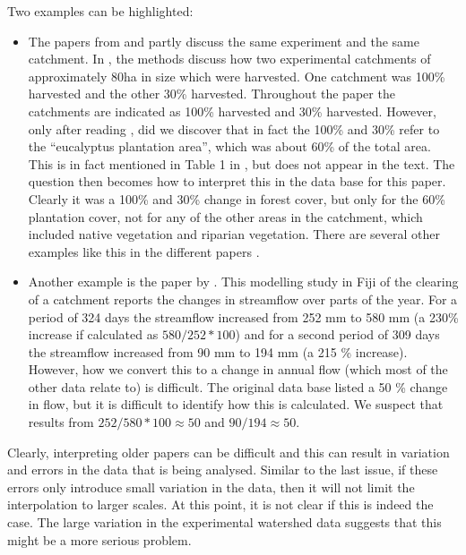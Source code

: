 \documentclass[]{elsarticle} %
\providecommand{\tightlist}{%
  \setlength{\itemsep}{0pt}\setlength{\parskip}{0pt}}
\begin{document}
Two examples can be highlighted:

\begin{itemize}
\tightlist
\item
  The papers from \citet{almeida2016} and \citet{ferreto2020} partly discuss the same experiment and the same catchment. In \citet{almeida2016}, the methods discuss how two experimental catchments of approximately 80ha in size which were harvested. One catchment was 100\% harvested and the other 30\% harvested. Throughout the paper the catchments are indicated as 100\% harvested and 30\% harvested. However, only after reading \citet{ferreto2020}, did we discover that in fact the 100\% and 30\% refer to the ``eucalyptus plantation area'', which was about 60\% of the total area. This is in fact mentioned in Table 1 in \citet{almeida2016}, but does not appear in the text. The question then becomes how to interpret this in the data base for this paper. Clearly it was a 100\% and 30\% change in forest cover, but only for the 60\% plantation cover, not for any of the other areas in the catchment, which included native vegetation and riparian vegetation. There are several other examples like this in the different papers \citep[for example][]{blackie1979kimakia, blackie1979kericho}.
\item
  Another example is the paper by \citet{waterloo2007}. This modelling study in Fiji of the clearing of a catchment reports the changes in streamflow over parts of the year. For a period of 324 days the streamflow increased from 252 mm to 580 mm (a 230\% increase if calculated as \(580/252*100\)) and for a second period of 309 days the streamflow increased from 90 mm to 194 mm (a 215 \% increase). However, how we convert this to a change in annual flow (which most of the other data relate to) is difficult. The original data base listed a 50 \% change in flow, but it is difficult to identify how this is calculated. We suspect that results from \(252/580*100 \approx 50\) and \(90/194 \approx 50\).
\end{itemize}

Clearly, interpreting older papers can be difficult and this can result in variation and errors in the data that is being analysed. Similar to the last issue, if these errors only introduce small variation in the data, then it will not limit the interpolation to larger scales. At this point, it is not clear if this is indeed the case. The large variation in the experimental watershed data suggests that this might be a more serious problem.
\end{document}
